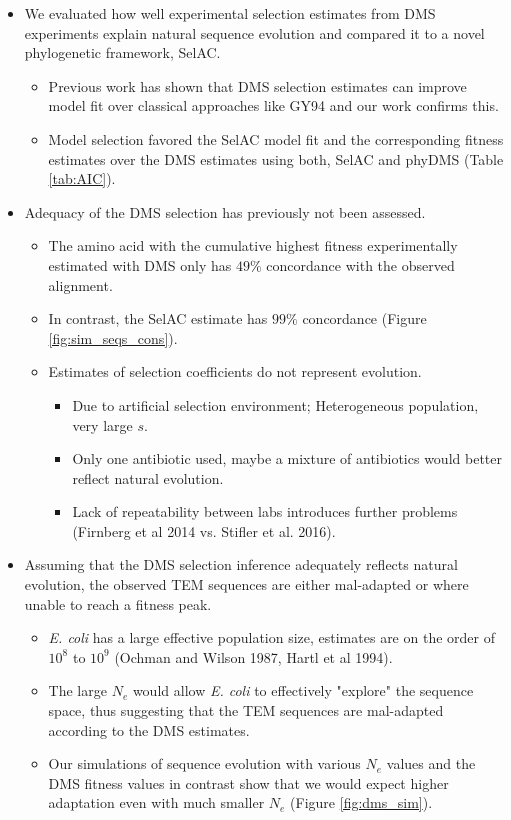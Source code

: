 \documentclass[12pt]{article}
\begin{document}
\begin{itemize}
	\item We evaluated how well experimental selection estimates from DMS experiments explain natural sequence evolution and compared it to a novel phylogenetic framework, SelAC.
	\begin{itemize}
		\item Previous work has shown that DMS selection estimates can improve model fit over classical approaches like GY94 and our work confirms this.
		\item Model selection favored the SelAC model fit and the corresponding fitness estimates over the DMS estimates using both, SelAC and phyDMS (Table \ref{tab:AIC}).
	\end{itemize}

	\item Adequacy of the DMS selection has previously not been assessed.
	\begin{itemize}	
		\item The amino acid with the cumulative highest fitness experimentally estimated with DMS only has $49 \%$ concordance with the observed alignment.
		\item In contrast, the SelAC estimate has $99 \%$ concordance (Figure \ref{fig:sim_seqs_cons}). 
		\item Estimates of selection coefficients do not represent evolution.
 		\begin{itemize}
			\item Due to artificial selection environment; Heterogeneous population, very large $s$. 
			\item Only one antibiotic used, maybe a mixture of antibiotics would better reflect natural evolution.
			\item Lack of repeatability between labs introduces further problems (Firnberg et al 2014 vs. Stifler et al. 2016).
		\end{itemize}
	\end{itemize}

	\item Assuming that the DMS selection inference adequately reflects natural evolution, the observed TEM sequences are either mal-adapted or where unable to reach a fitness peak.
	\begin{itemize}
		\item \textit{E. coli} has a large effective population size, estimates are on the order of $10^8$ to $10^9$ (Ochman and Wilson 1987, Hartl et al 1994).
		\item The large $N_e$ would allow \textit{E. coli} to effectively "explore" the sequence space, thus suggesting that the TEM sequences are mal-adapted according to the DMS estimates.
		\item Our simulations of sequence evolution with various $N_e$ values and the DMS fitness values in contrast show that we would expect higher adaptation even with much smaller $N_e$ (Figure \ref{fig:dms_sim}).
	\end{itemize}


\end{itemize}
\end{document}
